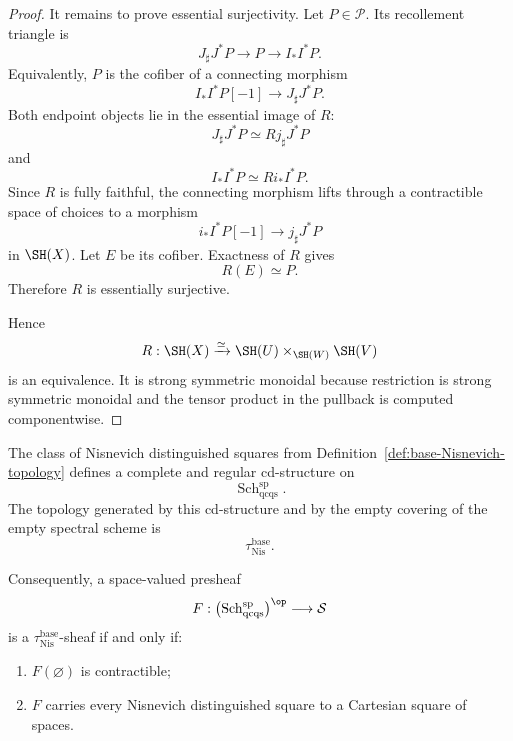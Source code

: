 \begin{proof}
It remains to prove essential surjectivity.  Let \(P\in\mathcal P\).  Its
recollement triangle is
\[
    J_\sharp J^*P
    \longrightarrow
    P
    \longrightarrow
    I_*I^*P.
\]
Equivalently, \(P\) is the cofiber of a connecting morphism
\[
    I_*I^*P[-1]
    \longrightarrow
    J_\sharp J^*P.
\]
Both endpoint objects lie in the essential image of \(R\):
\[
    J_\sharp J^*P
    \simeq
    Rj_\sharp J^*P
\]
and
\[
    I_*I^*P
    \simeq
    Ri_*I^*P.
\]
Since \(R\) is fully faithful, the connecting morphism lifts through a
contractible space of choices to a morphism
\[
    i_*I^*P[-1]
    \longrightarrow
    j_\sharp J^*P
\]
in \(\SH(X)\).  Let \(E\) be its cofiber.  Exactness of \(R\) gives
\[
    R(E)\simeq P.
\]
Therefore \(R\) is essentially surjective.

Hence
\[
    R:
    \SH(X)
    \xrightarrow{\simeq}
    \SH(U)\times_{\SH(W)}\SH(V)
\]
is an equivalence.  It is strong symmetric monoidal because restriction is
strong symmetric monoidal and the tensor product in the pullback is computed
componentwise.
\end{proof}


\begin{lemma}
\label{lem:base-Nis-cd-structure}
The class of Nisnevich distinguished squares from
Definition~\ref{def:base-Nisnevich-topology} defines a complete and regular
cd-structure on
\[
    \operatorname{Sch}^{\mathrm{sp}}_{\mathrm{qcqs}}.
\]
The topology generated by this cd-structure and by the empty covering of the
empty spectral scheme is
\[
    \tau_{\mathrm{Nis}}^{\mathrm{base}}.
\]

Consequently, a space-valued presheaf
\[
    F:
    \bigl(
      \operatorname{Sch}^{\mathrm{sp}}_{\mathrm{qcqs}}
    \bigr)^{\op}
    \longrightarrow
    \mathcal S
\]
is a \(\tau_{\mathrm{Nis}}^{\mathrm{base}}\)-sheaf if and only if:
\begin{enumerate}
    \item \(F(\varnothing)\) is contractible;
    \item \(F\) carries every Nisnevich distinguished square to a Cartesian
    square of spaces.
\end{enumerate}
\end{lemma}

